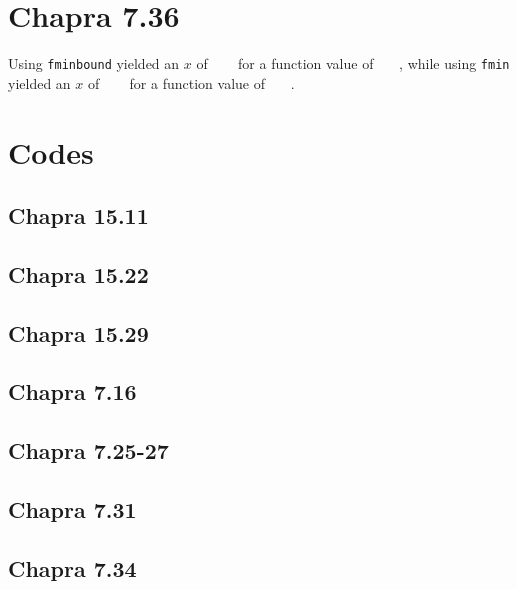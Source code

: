 \documentclass{article}
\begin{document}
\section{Chapra 7.36}
Using {\tt fminbound} yielded an $x$ of ~~~ for a function value of ~~~, while using {\tt fmin} yielded an $x$ of ~~~ for a function value of ~~~. 

\pagebreak
\appendix
\section{Codes}
\lstset{style=python103, language=python} 

\subsection{Chapra 15.11}
\clearpage

\subsection{Chapra 15.22}
\clearpage

\subsection{Chapra 15.29}
\clearpage

\subsection{Chapra 7.16}
\clearpage

\subsection{Chapra 7.25-27}
\clearpage

\subsection{Chapra 7.31}
\clearpage

\subsection{Chapra 7.34}
\end{document}
